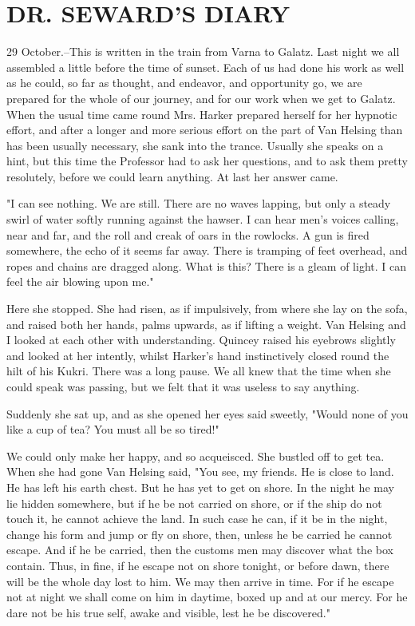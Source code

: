 \chapter{DR. SEWARD'S DIARY}

29 October.--This is written in the train from Varna to Galatz. Last night we all assembled a little before the time of sunset. Each of us had done his work as well as he could, so far as thought, and endeavor, and opportunity go, we are prepared for the whole of our journey, and for our work when we get to Galatz. When the usual time came round Mrs. Harker prepared herself for her hypnotic effort, and after a longer and more serious effort on the part of Van Helsing than has been usually necessary, she sank into the trance. Usually she speaks on a hint, but this time the Professor had to ask her questions, and to ask them pretty resolutely, before we could learn anything. At last her answer came. 

"I can see nothing. We are still. There are no waves lapping, but only a steady swirl of water softly running against the hawser. I can hear men's voices calling, near and far, and the roll and creak of oars in the rowlocks. A gun is fired somewhere, the echo of it seems far away. There is tramping of feet overhead, and ropes and chains are dragged along. What is this? There is a gleam of light. I can feel the air blowing upon me." 

Here she stopped. She had risen, as if impulsively, from where she lay on the sofa, and raised both her hands, palms upwards, as if lifting a weight. Van Helsing and I looked at each other with understanding. Quincey raised his eyebrows slightly and looked at her intently, whilst Harker's hand instinctively closed round the hilt of his Kukri. There was a long pause. We all knew that the time when she could speak was passing, but we felt that it was useless to say anything. 

Suddenly she sat up, and as she opened her eyes said sweetly, "Would none of you like a cup of tea? You must all be so tired!" 

We could only make her happy, and so acqueisced. She bustled off to get tea. When she had gone Van Helsing said, "You see, my friends. He is close to land. He has left his earth chest. But he has yet to get on shore. In the night he may lie hidden somewhere, but if he be not carried on shore, or if the ship do not touch it, he cannot achieve the land. In such case he can, if it be in the night, change his form and jump or fly on shore, then, unless he be carried he cannot escape. And if he be carried, then the customs men may discover what the box contain. Thus, in fine, if he escape not on shore tonight, or before dawn, there will be the whole day lost to him. We may then arrive in time. For if he escape not at night we shall come on him in daytime, boxed up and at our mercy. For he dare not be his true self, awake and visible, lest he be discovered." 

